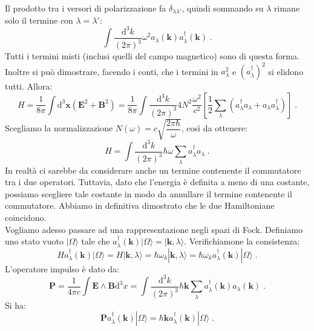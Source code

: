 \documentclass[12pt,a4paper]{report}
\theoremstyle{definition}
\numberwithin{equation}{section}
\newcommand{\diff}[1][]{\mathrm{d}#1}
\newcommand{\ket}{\rangle}
\newcommand{\adj}[1]{#1^{\dagger}}
\begin{document}
Il prodotto tra i versori di polarizzazione fa $\delta_{\lambda\lambda'}$, quindi sommando su $\lambda$ rimane solo il termine con $\lambda=\lambda'$:
\begin{equation}
\int \frac{\diff^3{k}}{(2\pi)^3}\omega^2 a_{\lambda}(\mathbf{k})\adj{a_{\lambda}}(\mathbf{k})\;.
\end{equation}
Tutti i termini misti (inclusi quelli del campo magnetico) sono di questa forma. Inoltre si può dimostrare, facendo i conti, che i termini in $a_{\lambda}^2$ e $(\adj{a_{\lambda}})^2$ si elidono tutti. Allora:
\begin{equation}
H=\frac{1}{8\pi}\int\diff^3{\mathbf{x}}(\mathbf{E}^2+\mathbf{B}^2)=\frac{1}{8\pi}\int\frac{\diff^3{k}}{(2\pi)^3}4N^2\frac{\omega^2}{c^2}\left[\frac{1}{2}\sum_{\lambda}(\adj{a_{\lambda}}a_{\lambda}+a_{\lambda}\adj{a_{\lambda}})\right]\;.
\end{equation}
Scegliamo la normalizzazione $N(\omega)=c\sqrt{\dfrac{2\pi\hbar}{\omega}}$, così da ottenere:
\begin{equation}
H=\int\frac{\diff^3{k}}{(2\pi)^3}\hbar\omega\sum_{\lambda}\adj{a_{\lambda}}a_{\lambda}\;.
\end{equation}
In realtà ci sarebbe da considerare anche un termine contenente il commutatore tra i due operatori. Tuttavia, dato che l'energia è definita a meno di una costante, possiamo scegliere tale costante in modo da annullare il termine contenente il commutatore. Abbiamo in definitiva dimostrato che le due Hamiltoniane coincidono. \\
Vogliamo adesso passare ad una rappresentazione negli spazi di Fock. Definiamo uno stato vuoto $|\Omega\ket$ tale che $\adj{a_{\lambda}}(\mathbf{k})|\Omega\ket=|\mathbf{k},\lambda\ket$. Verifichiamone la consistenza:
\begin{equation}
H\adj{a_{\lambda}}(\mathbf{k})|\Omega\ket=H|\mathbf{k},\lambda\ket=\hbar\omega_k |\mathbf{k},\lambda\ket=
\hbar\omega_k\adj{a_{\lambda}}(\mathbf{k})|\Omega\ket\;.
\end{equation}
L'operatore impulso è dato da:
\begin{equation}
\mathbf{P}=\frac{1}{4\pi c}\int\mathbf{E}\wedge\mathbf{B}\diff^3{x}=\int\frac{\diff^3{k}}{(2\pi)^3}\hbar\mathbf{k}\sum_{\lambda}\adj{a_{\lambda}}(\mathbf{k})a_{\lambda}(\mathbf{k})\;.
\end{equation}
Si ha:
\begin{equation}
\mathbf{P}\adj{a_{\lambda}}(\mathbf{k})|\Omega\ket=\hbar\mathbf{k}\adj{a_{\lambda}}(\mathbf{k})|\Omega\ket\;.
\end{equation}
\end{document}
